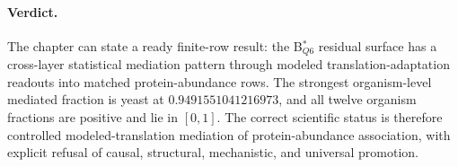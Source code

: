 \paragraph{Verdict.}
The chapter can state a ready finite-row result: the B$^{\ast}_{Q6}$ residual surface has a cross-layer statistical mediation pattern through modeled translation-adaptation readouts into matched protein-abundance rows.  The strongest organism-level mediated fraction is yeast at $0.9491551041216973$, and all twelve organism fractions are positive and lie in $[0,1]$.  The correct scientific status is therefore controlled modeled-translation mediation of protein-abundance association, with explicit refusal of causal, structural, mechanistic, and universal promotion.
